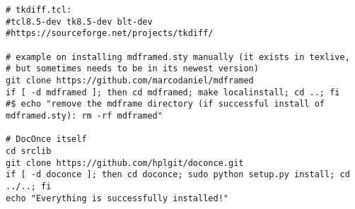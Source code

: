 \documentclass[%
oneside,                 %
final,                   %
chapterprefix=true,      %
open=right,              %
10pt]{book}
\begin{document}
\begin{verbatim}
# tkdiff.tcl:
#tcl8.5-dev tk8.5-dev blt-dev
#https://sourceforge.net/projects/tkdiff/

# example on installing mdframed.sty manually (it exists in texlive,
# but sometimes needs to be in its newest version)
git clone https://github.com/marcodaniel/mdframed
if [ -d mdframed ]; then cd mdframed; make localinstall; cd ..; fi
#$ echo "remove the mdframe directory (if successful install of mdframed.sty): rm -rf mdframed"

# DocOnce itself
cd srclib
git clone https://github.com/hplgit/doconce.git
if [ -d doconce ]; then cd doconce; sudo python setup.py install; cd ../..; fi
echo "Everything is successfully installed!"
\end{verbatim}


\end{document}
